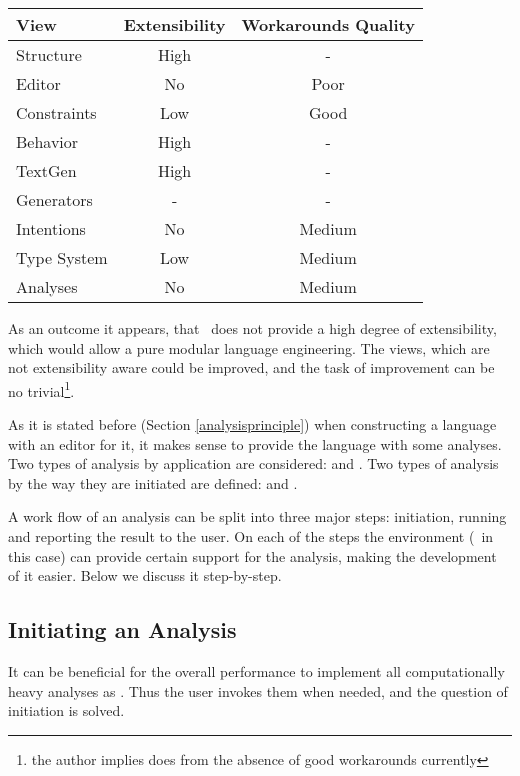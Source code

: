 \begin{center}
\begin{tabular}{l|c|c}
\textbf{View} & \textbf{Extensibility} & \textbf{Workarounds Quality} \\
\hline
Structure & High & -\\
Editor & No & Poor\\
Constraints & Low & Good\\
Behavior & High & -\\
TextGen & High & -\\
Generators & - & -\\
Intentions & No & Medium\\
Type System & Low & Medium\\
Analyses & No & Medium
\end{tabular}
\end{center}


As an outcome it appears, that \jbmps\ does not provide a high degree of extensibility, which would allow 
a pure modular language engineering. The views, which are not extensibility aware could be improved, and the
task of improvement can be no trivial\footnote{the author implies does from the absence of good workarounds currently}.


As it is stated before (Section \ref{analysisprinciple}) when constructing a language with an editor for it, 
it makes sense to provide the language with some analyses. Two types of analysis by application are considered:
 and . Two types of analysis by the way they are initiated are defined: 
 and .

A work flow of an analysis can be split into three major steps: initiation, running and reporting the result to the user.
On each of the steps the environment (\jbmps\ in this case) can provide certain support for the analysis, making the 
development of it easier. Below we discuss it step-by-step.

\subsection{Initiating an Analysis}

It can be beneficial for the overall  performance to implement all computationally heavy analyses 
as . Thus the user invokes them when needed, and the question of initiation is solved.

